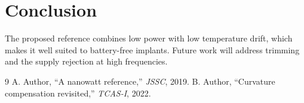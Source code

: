 \documentclass[10pt,twocolumn]{article}
\begin{document}
\section{Conclusion}
The proposed reference combines low power with low temperature drift, which
makes it well suited to battery-free implants. Future work will address
trimming and the supply rejection at high frequencies.
\begin{thebibliography}{9}
 A. Author, ``A nanowatt reference,'' \emph{JSSC}, 2019.
 B. Author, ``Curvature compensation revisited,'' \emph{TCAS-I}, 2022.
\end{thebibliography}
\end{document}
